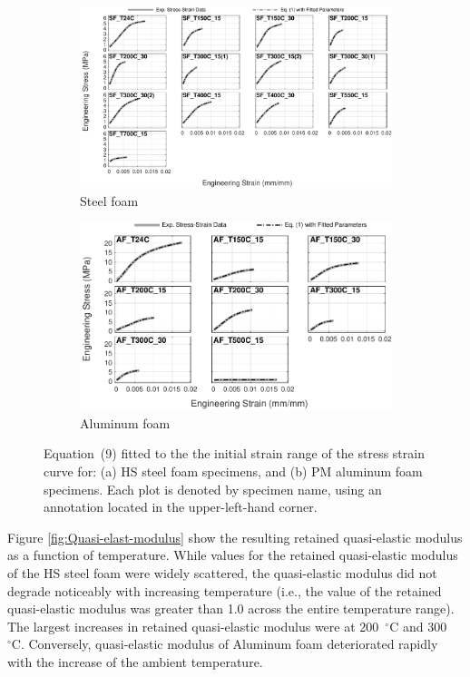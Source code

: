 \documentclass[review]{elsarticle}
\begin{document}
\begin{figure}
	\centering
	\begin{subfigure}{1.00\textwidth}
		\centering
		\includegraphics[width=0.90\linewidth]
		{Tex-Figures/Fig16a-quasi-Elastic-fit-Fe.pdf}
		\caption{Steel foam}
		\label{fig:qElas_Rich_Steel}
	\end{subfigure}

	\par\bigskip %

	\begin{subfigure}{1.00\textwidth}
		\centering
		\includegraphics[width=0.70\linewidth]
		{Tex-Figures/Fig16b-quasi-Elastic-fit-Al.pdf}
		\caption{Aluminum foam}
		\label{fig:qElas_Rich_Al}
	\end{subfigure}
	\caption{Equation~(9) fitted to the the initial strain range of the stress strain curve for: (a) HS steel foam specimens, and (b) PM aluminum foam specimens. Each plot is denoted by specimen name, using an annotation located in the upper-left-hand corner.}
	\label{fig:Stress_strain_elast_fit}
\end{figure}

Figure \ref{fig:Quasi-elast-modulus} show the resulting retained quasi-elastic modulus as a function of temperature. While values for the retained quasi-elastic modulus of the HS steel foam were widely scattered, the quasi-elastic modulus did not degrade noticeably with increasing temperature (i.e., the value of the retained quasi-elastic modulus was greater than 1.0 across the entire temperature range). The largest increases in retained quasi-elastic modulus were at 200~$^\circ\mathrm{C}$ and 300~$^\circ\mathrm{C}$. Conversely, quasi-elastic modulus of Aluminum foam deteriorated rapidly with the increase of the ambient temperature.
\end{document}
